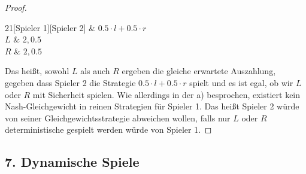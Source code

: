 \documentclass[12pt]{article}
\begin{document}
\begin{enumerate}[label=\alph*\upshape)]
\begin{proof}
			\begin{center}
				\begin{game}{2}{1}[Spieler 1][Spieler 2]
					    & $0.5 \cdot l + 0.5 \cdot r$   \\
	 				$L$ &  $2, 0.5$ \\
	 				$R$ &  $2, 0.5$  \\
				\end{game}
			\end{center}
		
			Das heißt, sowohl $L$ als auch $R$ ergeben die gleiche erwartete Auszahlung, gegeben dass Spieler 2 die Strategie $0.5 \cdot l + 0.5 \cdot r$ spielt und es ist egal, ob wir $L$ oder $R$ mit Sicherheit spielen. Wie allerdings in der a) besprochen, existiert kein Nash-Gleichgewicht in reinen Strategien für Spieler 1. Das heißt Spieler 2 würde von seiner Gleichgewichtsstrategie abweichen wollen, falls nur $L$ oder $R$ deterministische gespielt werden würde von Spieler 1.
		\end{proof}
\end{enumerate}

\newpage

\subsection*{7. Dynamische Spiele}
\end{document}
